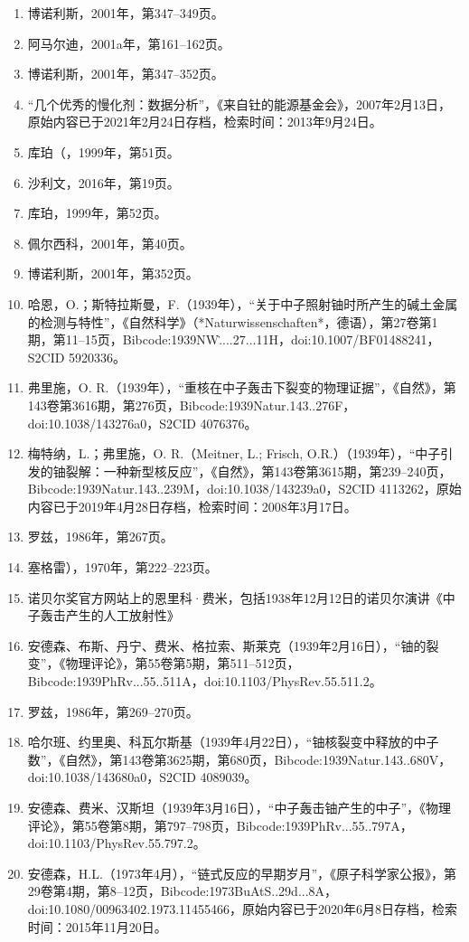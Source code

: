 \begin{enumerate}
\item 博诺利斯，2001年，第347–349页。
\item 阿马尔迪，2001a年，第161–162页。
\item 博诺利斯，2001年，第347–352页。
\item “几个优秀的慢化剂：数据分析”，《来自钍的能源基金会》，2007年2月13日，原始内容已于2021年2月24日存档，检索时间：2013年9月24日。
\item 库珀（，1999年，第51页。
\item 沙利文，2016年，第19页。
\item 库珀，1999年，第52页。
\item 佩尔西科，2001年，第40页。
\item 博诺利斯，2001年，第352页。
\item 哈恩，O.；斯特拉斯曼，F.（1939年），“关于中子照射铀时所产生的碱土金属的检测与特性”，《自然科学》（*Naturwissenschaften*，德语），第27卷第1期，第11–15页，Bibcode:1939NW\.....27...11H，doi:10.1007/BF01488241，S2CID 5920336。
\item 弗里施，O. R.（1939年），“重核在中子轰击下裂变的物理证据”，《自然》，第143卷第3616期，第276页，Bibcode:1939Natur.143..276F，doi:10.1038/143276a0，S2CID 4076376。
\item 梅特纳，L.；弗里施，O. R.（Meitner, L.; Frisch, O.R.）（1939年），“中子引发的铀裂解：一种新型核反应”，《自然》，第143卷第3615期，第239–240页，Bibcode:1939Natur.143..239M，doi:10.1038/143239a0，S2CID 4113262，原始内容已于2019年4月28日存档，检索时间：2008年3月17日。
\item 罗兹，1986年，第267页。
\item 塞格雷），1970年，第222–223页。
\item 诺贝尔奖官方网站上的恩里科·费米，包括1938年12月12日的诺贝尔演讲《中子轰击产生的人工放射性》
\item 安德森、布斯、丹宁、费米、格拉索、斯莱克（1939年2月16日），“铀的裂变”，《物理评论》，第55卷第5期，第511–512页，Bibcode:1939PhRv...55..511A，doi:10.1103/PhysRev.55.511.2。
\item 罗兹，1986年，第269–270页。
\item 哈尔班、约里奥、科瓦尔斯基（1939年4月22日），“铀核裂变中释放的中子数”，《自然》，第143卷第3625期，第680页，Bibcode:1939Natur.143..680V，doi:10.1038/143680a0，S2CID 4089039。
\item 安德森、费米、汉斯坦（1939年3月16日），“中子轰击铀产生的中子”，《物理评论》，第55卷第8期，第797–798页，Bibcode:1939PhRv...55..797A，doi:10.1103/PhysRev.55.797.2。
\item 安德森，H.L.（1973年4月），“链式反应的早期岁月”，《原子科学家公报》，第29卷第4期，第8–12页，Bibcode:1973BuAtS..29d...8A，doi:10.1080/00963402.1973.11455466，原始内容已于2020年6月8日存档，检索时间：2015年11月20日。

\end{enumerate}
